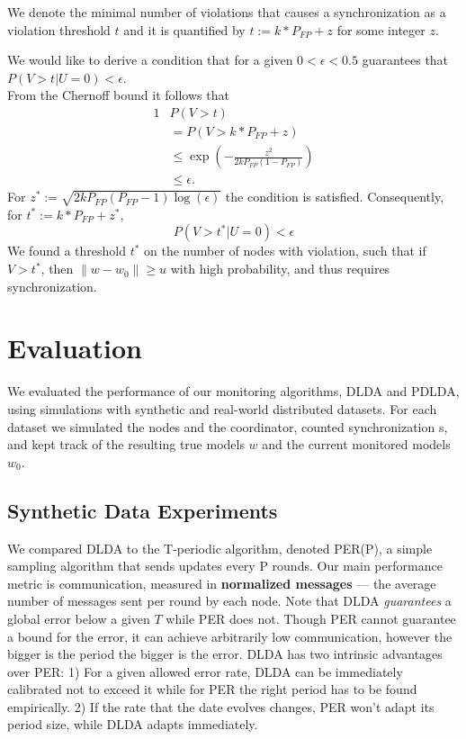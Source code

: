 \documentclass{sig-alternate-05-2015}
\begin{document}
We denote the minimal number of violations that causes a synchronization as a violation
threshold $t$ and it is quantified by $t:=k*P_{FP}+z$ for some integer $z$.

We would like to derive a condition that for a given $0 < \epsilon < 0.5$ guarantees that
$P(V>t|U=0) < \epsilon$.
\\From the Chernoff bound it follows that
\begin{alignat*}{1}
& P(V>t) \\
& = P(V>k*P_{FP}+z) \\
& \leq \exp(-\frac{z^2}{2kP_{FP}(1-P_{FP})}) \\
& \leq \epsilon.
\end{alignat*}
For $z^*:=\sqrt{2kP_{FP}(P_{FP}-1)\log(\epsilon)}$ the condition is satisfied.
Consequently, for $t^*:=k*P_{FP}+z^*$,  $$P(V > t^*|U=0) <
\epsilon$$
We found a threshold $t^*$ on the number of nodes with violation, such that if $V > t^*$,  then
$\|w-w_0\| \geq u$ with high probability, and thus requires synchronization.
\section{Evaluation}
We evaluated the performance of our monitoring algorithms,
DLDA and PDLDA, using simulations with synthetic and real-world
distributed datasets.
For each dataset we simulated the nodes and the coordinator,
counted synchronization s, and kept track of the resulting true models $w$ and the
current monitored models $w_0$.
\subsection{Synthetic Data Experiments}
We compared DLDA to the T-periodic algorithm, denoted
PER(P), a simple sampling algorithm that sends updates
every P rounds.
Our main performance metric is communication, measured
in \textbf{normalized messages} --- the average number of messages sent per
round by each node. Note that DLDA \textit{guarantees}
a global error below a given $T$ while PER does not.
Though PER cannot guarantee a bound for the
error, it can achieve arbitrarily low communication, however the bigger is the period the bigger is the error. DLDA has two intrinsic
advantages over PER: 1) For a given allowed error rate, DLDA can be immediately
calibrated not to exceed it while for PER the right period has to be found empirically.
2) If the rate that the date evolves changes, PER won't adapt its period size,
while DLDA adapts immediately.
\end{document}
